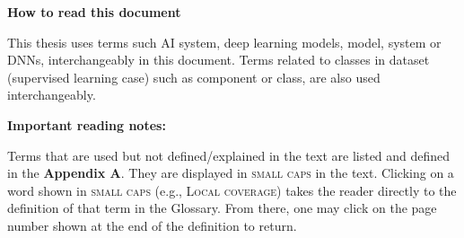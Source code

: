 
\begin{center}
{\fontsize{16}{15} \bf How to read this document}
\vspace{0.4cm}
\end{center}
\normalsize

This thesis uses terms such AI system, deep learning models, model, system or DNNs, interchangeably in this document. Terms related to classes in dataset (supervised learning case) such as component or class, are also used interchangeably.

\textbf{Important reading notes:}

     Terms that are used but not defined/explained in the text are listed and defined in the \textbf{Appendix A}. They are displayed in \textsc{small caps} in the text. Clicking on a word shown in \textsc{small caps} (e.g., \textsc{Local coverage}) takes the reader directly to the definition of that term in the Glossary. From there, one may click on the page number shown at the end of the definition to return.



\clearpage

